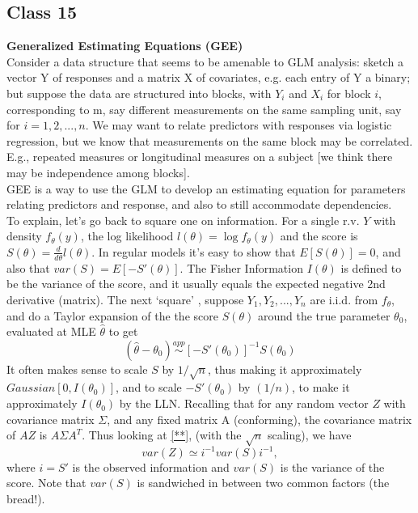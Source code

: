 \documentclass[11pt,a4paper]{article}
\begin{document}
\subsection*{Class 15}
\textbf{Generalized Estimating Equations (GEE)}\\
Consider a data structure that seems to be amenable to GLM analysis:   sketch a vector Y of responses and a matrix X of covariates, e.g. each entry of Y a binary; but suppose the data are structured into blocks, with $Y_i$ and $X_i$ for block $i$, corresponding to m, say different measurements on the same sampling unit, say for $i = 1,2,..., n$.   We may want to relate predictors with responses via logistic regression, but we know that measurements on the same block may be correlated.   E.g., repeated measures or longitudinal measures on a subject [we think there may be independence among blocks].\\
GEE is a way to use the GLM to develop an estimating equation for parameters relating predictors and response, and also to still accommodate dependencies.\\
To explain, let's go back to square one on information.  For a single r.v. $Y$ with density $f_\theta(y)$, the log likelihood $l(\theta) = \log f_\theta(y)$ and the score is $S(\theta) = \frac{d}{d\theta} l(\theta)$.    In regular models it's easy to show that $E[ S(\theta) ] = 0$, and also that $var( S ) = E[ - S'(\theta) ]$.  The Fisher Information $I(\theta)$ is defined to be the variance of the score, and it usually equals the expected negative 2nd derivative (matrix).  The next `square' , suppose $Y_1, Y_2,..., Y_n$ are i.i.d. from $f_\theta$,  and do a Taylor expansion of the the score $S(\theta)$ around the true parameter $\theta_0$, evaluated at MLE $\hat{\theta}$ to get
\begin{equation}\label{**}
( \hat{\theta} - \theta_0 ) \stackrel{app}{\sim} [ -S'(\theta_0) ]^{-1}  S(\theta_0)
\end{equation}
It often makes sense to scale $S$ by $1/\sqrt{n}$, thus making it approximately $Gaussian[ 0, I(\theta_0) ]$, and to scale $-S'(\theta_0)$ by $(1/n)$, to make it approximately $I(\theta_0)$ by the LLN.   Recalling that for any random vector $Z$ with covariance matrix $\Sigma$, and any fixed matrix A (conforming),  the covariance matrix of $A Z$ is $A \Sigma A^T$.  Thus looking at \eqref{**}, (with the $\sqrt{n}$ scaling), we have
$$var(Z) \simeq i^{-1}  var(S) i^{-1},$$     where $i = S'$ is the observed information and $var(S)$ is the variance of the score.  Note that $var(S)$ is sandwiched in between two common factors (the bread!).\\
\end{document}
